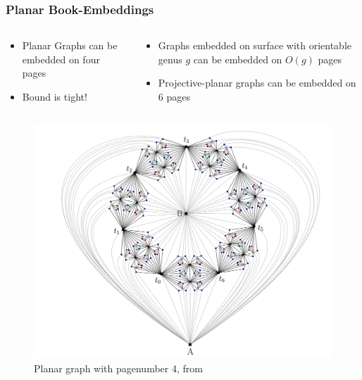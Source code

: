 \documentclass[english]{beamer}
\begin{document}
\begin{frame}
  \frametitle{Planar Book-Embeddings}
  \begin{columns}
    \begin{column}{0.5\textwidth}
      \begin{itemize}
        \item Planar Graphs can be embedded on four pages \cite{yannakakisEmbeddingPlanarGraphs1989}
        \item Bound is tight! \cite{yannakakisPlanarGraphsThat2020,bekosFourPagesAre2020}
      \end{itemize}
    \end{column}
    \begin{column}{0.5\textwidth}
      \begin{itemize}
        \item Graphs embedded on surface with orientable genus $g$ can be embedded on $O(g)$ pages \cite{heathPagenumberGenusGraphs1992}
        \item Projective-planar graphs can be embedded on 6 pages \cite{ozekiBookEmbeddingGraphs2019}
      \end{itemize}
    \end{column}
  \end{columns}
  \begin{figure}
    \centering
    \includegraphics[height = 0.5\textheight]{figures/Screenshot 2024-09-26 152422.png}
    \caption{Planar graph with pagenumber 4, from \cite{bekosFourPagesAre2020}}
  \end{figure}

\end{frame}
\end{document}
